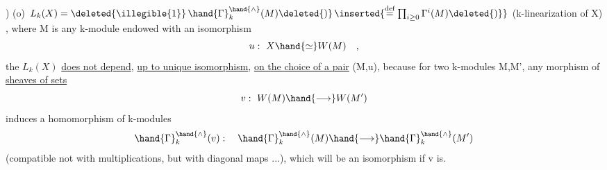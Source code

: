 
)
(o) \qquad $L_k(X) = \deleted{\illegible{1}}\,\hand{\Gamma}_k^{\hand{\wedge}}(M)\deleted{)}\,\inserted{\overset{\text{def}}{=}\prod_{i\geq 0}\Gamma^{i}(M)\deleted{)}}$ \hand{(}(k-linearization of X) ,
where M is any k-module endowed with an isomorphism
\[ u:\ X \hand{\simeq} W(M) \quad , \]
the   $L_k(X)$ \uline{does not depend}, \uline{up to unique isomorphism}, \uline{on the
choice of a pair} (M,u), because  for two k-modules M,M', any
morphism of \uline{sheaves of sets}
\[ v:\ W(M) \hand{\longrightarrow} W(M') \]
induces a  homomorphism of k-modules
\[ \hand{\Gamma}_k^{\hand{\wedge}}(v):\quad \hand{\Gamma}_k^{\hand{\wedge}}(M) \hand{\longrightarrow} \hand{\Gamma}_k^{\hand{\wedge}}(M') \]
(compatible not with multiplications, but with diagonal maps ...), 
which will be an isomorphism if v is.

